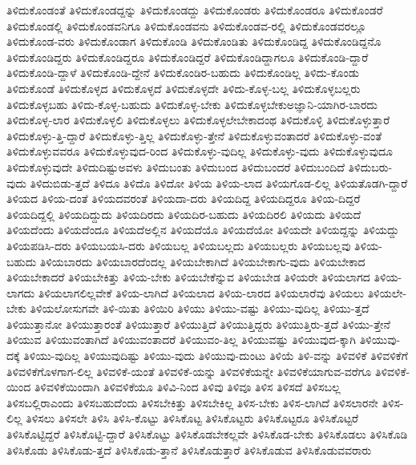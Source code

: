 {ತಿಳಿದುಕೊಂಡಂತೆ
ತಿಳಿದುಕೊಂಡದ್ದನ್ನು
ತಿಳಿದುಕೊಂಡದ್ದು
ತಿಳಿದುಕೊಂಡರು
ತಿಳಿದುಕೊಂಡರೂ
ತಿಳಿದುಕೊಂಡರೆ
ತಿಳಿದುಕೊಂಡಲ್ಲಿ
ತಿಳಿದುಕೊಂಡವನಿಗೂ
ತಿಳಿದುಕೊಂಡವನು
ತಿಳಿದುಕೊಂಡವ-ರಲ್ಲಿ
ತಿಳಿದುಕೊಂಡವರಲ್ಲೂ
ತಿಳಿದುಕೊಂಡ-ವರು
ತಿಳಿದುಕೊಂಡಾಗ
ತಿಳಿದುಕೊಂಡಿ
ತಿಳಿದುಕೊಂಡಿತು
ತಿಳಿದುಕೊಂಡಿದ್ದ
ತಿಳಿದುಕೊಂಡಿದ್ದನೊ
ತಿಳಿದುಕೊಂಡಿದ್ದರು
ತಿಳಿದುಕೊಂಡಿದ್ದರೂ
ತಿಳಿದುಕೊಂಡಿದ್ದರೆ
ತಿಳಿದುಕೊಂಡಿದ್ದಾಗಲೂ
ತಿಳಿದುಕೊಂಡಿ-ದ್ದಾರೆ
ತಿಳಿದುಕೊಂಡಿ-ದ್ದಾಳೆ
ತಿಳಿದುಕೊಂಡಿ-ದ್ದೇನೆ
ತಿಳಿದುಕೊಂಡಿರ-ಬಹುದು
ತಿಳಿದುಕೊಂಡಿಲ್ಲ
ತಿಳಿದು-ಕೊಂಡು
ತಿಳಿದುಕೊಂಡೆ
ತಿಳಿದುಕೊಳ್ಳದ
ತಿಳಿದುಕೊಳ್ಳದೆ
ತಿಳಿದುಕೊಳ್ಳದೇ
ತಿಳಿದು-ಕೊಳ್ಳ-ಬಲ್ಲ
ತಿಳಿದುಕೊಳ್ಳಬಲ್ಲರು
ತಿಳಿದುಕೊಳ್ಳಬಹು
ತಿಳಿದು-ಕೊಳ್ಳ-ಬಹುದು
ತಿಳಿದುಕೊಳ್ಳ-ಬೇಕು
ತಿಳಿದುಕೊಳ್ಳಬೇಕುಅಜ್ಞಾನಿ-ಯಾಗಿರ-ಬಾರದು
ತಿಳಿದುಕೊಳ್ಳ-ಲಾರ
ತಿಳಿದುಕೊಳ್ಳಲಿ
ತಿಳಿದುಕೊಳ್ಳಲು
ತಿಳಿದುಕೊಳ್ಳಲೇಬೇಕಾದಂಥ
ತಿಳಿದುಕೊಳ್ಳಿ
ತಿಳಿದುಕೊಳ್ಳುತ್ತಾರೆ
ತಿಳಿದುಕೊಳ್ಳು-ತ್ತಿ-ದ್ದಾರೆ
ತಿಳಿದುಕೊಳ್ಳು-ತ್ತಿಲ್ಲ
ತಿಳಿದುಕೊಳ್ಳು-ತ್ತೇನೆ
ತಿಳಿದುಕೊಳ್ಳುವಂತಾದರೆ
ತಿಳಿದುಕೊಳ್ಳು-ವಂತೆ
ತಿಳಿದುಕೊಳ್ಳುವವರೂ
ತಿಳಿದುಕೊಳ್ಳುವುದ-ರಿಂದ
ತಿಳಿದುಕೊಳ್ಳು-ವುದಿಲ್ಲ
ತಿಳಿದುಕೊಳ್ಳು-ವುದು
ತಿಳಿದುಕೊಳ್ಳುವುದೂ
ತಿಳಿದುಕೊಳ್ಳುವುದೇ
ತಿಳಿದುದಿಷ್ಟುಅವಳು
ತಿಳಿದುಬಂತು
ತಿಳಿದುಬಂದ
ತಿಳಿದುಬಂದರೆ
ತಿಳಿದುಬಂದಿದೆ
ತಿಳಿದುಬರು-ವುದು
ತಿಳಿದುಬಿಡು-ತ್ತದೆ
ತಿಳಿದೂ
ತಿಳಿದೊ
ತಿಳಿದೋ
ತಿಳಿಯ
ತಿಳಿಯ-ಲಾದ
ತಿಳಿಯಗೊಡ-ಲಿಲ್ಲ
ತಿಳಿಯತೊಡಗಿ-ದ್ದಾರೆ
ತಿಳಿಯದ
ತಿಳಿಯ-ದಂತೆ
ತಿಳಿಯದವರಂತೆ
ತಿಳಿಯದಾ-ದರು
ತಿಳಿಯದಿದ್ದ
ತಿಳಿಯದಿದ್ದರೂ
ತಿಳಿಯ-ದಿದ್ದರೆ
ತಿಳಿಯದಿದ್ದಲ್ಲಿ
ತಿಳಿಯದಿದ್ದುದು
ತಿಳಿಯದಿರದು
ತಿಳಿಯದಿರ-ಬಹುದು
ತಿಳಿಯದಿರಲಿ
ತಿಳಿಯದು
ತಿಳಿಯದೆ
ತಿಳಿಯದೆಂದು
ತಿಳಿಯದೆಂದೂ
ತಿಳಿಯದೆಅಲ್ಲಿನ
ತಿಳಿಯದೆಯೊ
ತಿಳಿಯದೆಯೋ
ತಿಳಿಯದೇ
ತಿಳಿಯದ್ದನ್ನು
ತಿಳಿಯದ್ದು
ತಿಳಿಯಪಡಿಸಿ-ದರು
ತಿಳಿಯಬಯಸಿ-ದರು
ತಿಳಿಯಬಲ್ಲ
ತಿಳಿಯಬಲ್ಲದು
ತಿಳಿಯಬಲ್ಲರು
ತಿಳಿಯಬಲ್ಲವು
ತಿಳಿಯ-ಬಹುದು
ತಿಳಿಯಬಾರದು
ತಿಳಿಯಬಾರದೆಂದಲ್ಲ
ತಿಳಿಯಬೇಕಾಗಿದೆ
ತಿಳಿಯಬೇಕಾಗು-ವುದು
ತಿಳಿಯಬೇಕಾದ
ತಿಳಿಯಬೇಕಾದರೆ
ತಿಳಿಯಬೇಕಿತ್ತು
ತಿಳಿಯ-ಬೇಕು
ತಿಳಿಯಬೇಕೆನ್ನುವ
ತಿಳಿಯಬೇಡ
ತಿಳಿಯರೇ
ತಿಳಿಯಲಾಗದ
ತಿಳಿಯ-ಲಾಗದು
ತಿಳಿಯಲಾಗಲಿಲ್ಲವೇಕೆ
ತಿಳಿಯ-ಲಾಗಿದೆ
ತಿಳಿಯಲಾದ
ತಿಳಿಯ-ಲಾರದ
ತಿಳಿಯಲಾರೆವು
ತಿಳಿಯಲು
ತಿಳಿಯಲೇ-ಬೇಕು
ತಿಳಿಯಲೋಸುಗವೇ
ತಿಳಿ-ಯಿತು
ತಿಳಿಯಿರಿ
ತಿಳಿಯು
ತಿಳಿಯು-ವಷ್ಟು
ತಿಳಿಯು-ವುದಿಲ್ಲ
ತಿಳಿಯು-ತ್ತದೆ
ತಿಳಿಯುತ್ತಾನೋ
ತಿಳಿಯುತ್ತಾರಂತೆ
ತಿಳಿಯುತ್ತಾರೆ
ತಿಳಿಯುತ್ತಿದೆ
ತಿಳಿಯುತ್ತಿದ್ದರು
ತಿಳಿಯುತ್ತಿರು-ತ್ತದೆ
ತಿಳಿಯು-ತ್ತೇನೆ
ತಿಳಿಯುವ
ತಿಳಿಯುವಂತಾಗಿದೆ
ತಿಳಿಯುವಂತಾದರೆ
ತಿಳಿಯುವಂ-ತಿಲ್ಲ
ತಿಳಿಯುವಷ್ಟು
ತಿಳಿಯುವುದ-ಕ್ಕಾಗಿ
ತಿಳಿಯುವು-ದಕ್ಕೆ
ತಿಳಿಯು-ವುದಿಲ್ಲ
ತಿಳಿಯುವುದಿಷ್ಟು
ತಿಳಿಯು-ವುದು
ತಿಳಿಯುವು-ದುಂಟು
ತಿಳಿಯೆ
ತಿಳಿ-ವನ್ನು
ತಿಳಿವಳಿಕೆ
ತಿಳಿವಳಿಕೆಗೆ
ತಿಳಿವಳಿಕೆಗೊಳಗಾಗ-ಲಿಲ್ಲ
ತಿಳಿವಳಿಕೆ-ಯಂತೆ
ತಿಳಿವಳಿಕೆ-ಯನ್ನು
ತಿಳಿವಳಿಕೆಯನ್ನೇ
ತಿಳಿವಳಿಕೆಯಾಗುವ-ವರೆಗೂ
ತಿಳಿವಳಿಕೆ-ಯಿಂದ
ತಿಳಿವಳಿಕೆಯಿಂದಾಗಿ
ತಿಳಿವಳಿಕೆಯೂ
ತಿಳಿವಿ-ನಿಂದ
ತಿಳಿವು
ತಿಳಿವೂ
ತಿಳಿಸ
ತಿಳಿಸದೆ
ತಿಳಿಸಬಲ್ಲ
ತಿಳಿಸಬಲ್ಲಿರಾಎಂದು
ತಿಳಿಸಬಹುದೆಂದು
ತಿಳಿಸಬೇಕಿತ್ತು
ತಿಳಿಸಬೇಕಿಲ್ಲ
ತಿಳಿಸ-ಬೇಕು
ತಿಳಿಸ-ಲಾಗಿದೆ
ತಿಳಿಸಲಾರನೇ
ತಿಳಿಸ-ಲಿಲ್ಲ
ತಿಳಿಸಲು
ತಿಳಿಸಲೇ
ತಿಳಿಸಿ
ತಿಳಿಸಿ-ಕೊಟ್ಟು
ತಿಳಿಸಿಕೊಟ್ಟ
ತಿಳಿಸಿಕೊಟ್ಟರು
ತಿಳಿಸಿಕೊಟ್ಟರೂ
ತಿಳಿಸಿಕೊಟ್ಟರೆ
ತಿಳಿಸಿಕೊಟ್ಟಿದ್ದರೆ
ತಿಳಿಸಿಕೊಟ್ಟಿ-ದ್ದಾರೆ
ತಿಳಿಸಿಕೊಟ್ಟು
ತಿಳಿಸಿಕೊಡಬೇಕಲ್ಲವೇ
ತಿಳಿಸಿಕೊಡ-ಬೇಕು
ತಿಳಿಸಿಕೊಡಲು
ತಿಳಿಸಿಕೊಡಿ
ತಿಳಿಸಿಕೊಡು
ತಿಳಿಸಿಕೊಡು-ತ್ತದೆ
ತಿಳಿಸಿಕೊಡು-ತ್ತಾನೆ
ತಿಳಿಸಿಕೊಡುತ್ತಾರೆ
ತಿಳಿಸಿಕೊಡುವ
ತಿಳಿಸಿಕೊಡುವವರಾರು
}
